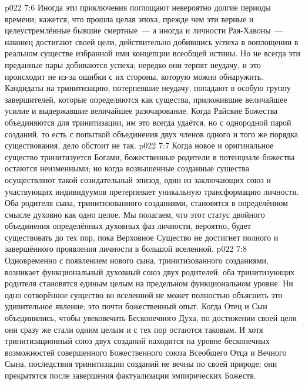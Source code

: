 \vs p022 7:6 Иногда эти приключения поглощают невероятно долгие периоды времени; кажется, что прошла целая эпоха, прежде чем эти верные и целеустремлённые бывшие смертные~--- а иногда и личности Рая\hyp{}Хавоны~--- наконец достигают своей цели, действительно добившись успеха в воплощении в реальном существе избранной ими концепции всеобщей истины. Но не всегда эти преданные пары добиваются успеха; нередко они терпят неудачу, и это происходит не из\hyp{}за ошибки с их стороны, которую можно обнаружить. Кандидаты на тринитизацию, потерпевшие неудачу, попадают в особую группу завершителей, которые определяются как существа, приложившие величайшее усилие и выдержавшие величайшее разочарование. Когда Райские Божества объединяются для тринитизации, им это всегда удаётся, но с однородной парой созданий, то есть с попыткой объединения двух членов одного и того же порядка существования, дело обстоит не так.
\vs p022 7:7 \pc Когда новое и оригинальное существо тринитизуется Богами, божественные родители в потенциале божества остаются неизменными; но когда возвышенные созданные существа осуществляют такой созидательный эпизод, один из заключающих союз и участвующих индивидуумов претерпевает уникальную трансформацию личности. Оба родителя сына, тринитизованного созданиями, становятся в определённом смысле духовно как одно целое. Мы полагаем, что этот статус двойного объединения определённых духовных фаз личности, вероятно, будет существовать до тех пор, пока Верховное Существо не достигнет полного и завершённого проявления личности в большой вселенной.
\vs p022 7:8 Одновременно с появлением нового сына, тринитизованного созданиями, возникает функциональный духовный союз двух родителей; оба тринитизующих родителя становятся единым целым на предельном функциональном уровне. Ни одно сотворённое существо во вселенной не может полностью объяснить это удивительное явление; это почти божественный опыт. Когда Отец и Сын объединились, чтобы увековечить Бесконечного Духа, по достижении своей цели они сразу же стали одним целым и с тех пор остаются таковым. И хотя тринитизационный союз двух созданий находится на уровне бесконечных возможностей совершенного Божественного союза Всеобщего Отца и Вечного Сына, последствия тринитизации созданий не вечны по своей природе; они прекратятся после завершения фактуализации эмпирических Божеств.
